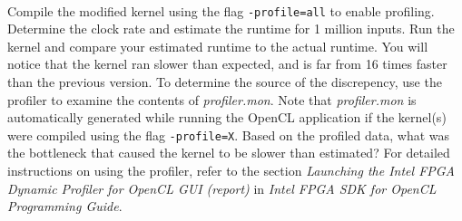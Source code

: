 \documentclass[epsfig,10pt,fullpage]{article}
\newcommand{\CommonDocsPath}{../../common/docs}
\begin{document}
~\\
Compile the modified kernel using the flag \texttt{-profile=all} to enable profiling. Determine the clock rate and estimate the runtime for 1 million inputs. Run the kernel and compare your estimated runtime to the actual runtime. 
You will notice that the kernel ran slower than expected, and is far from 16 times faster than the previous version. To determine the source of the discrepency, use the profiler to examine the contents of \textit{profiler.mon}. Note that \textit{profiler.mon} is automatically generated while running the OpenCL application if the kernel(s) were compiled using the flag \texttt{-profile=X}. Based on the profiled data, what was the bottleneck that caused the kernel to be slower than estimated? 
For detailed instructions on using the profiler, refer to the section \textit{Launching the Intel FPGA Dynamic Profiler for OpenCL GUI (report)} in \textit{Intel FPGA SDK for OpenCL Programming Guide}.



\end{document}
